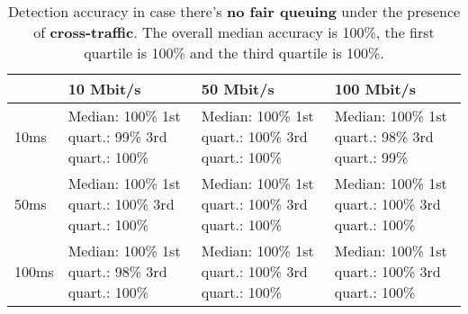 \documentclass[conference]{IEEEtran}
\begin{document}
\begin{table}
\begin{tabularx}{\columnwidth}{| l | X | X | X |}
\hline
& 10 Mbit/s & 50 Mbit/s & 100 Mbit/s \\ \hline
10ms & Median: 100\% \newline 1st quart.: 99\% \newline 3rd quart.: 100\% & Median: 100\% \newline 1st quart.: 100\% \newline 3rd quart.: 100\% & Median: 100\% \newline 1st quart.: 98\% \newline 3rd quart.: 99\%\\ \hline
50ms & Median: 100\% \newline 1st quart.: 100\% \newline 3rd quart.: 100\% & Median: 100\% \newline 1st quart.: 100\% \newline 3rd quart.: 100\% & Median: 100\% \newline 1st quart.: 100\% \newline 3rd quart.: 100\% \\ \hline
100ms & Median: 100\% \newline 1st quart.: 98\% \newline 3rd quart.: 100\% & Median: 100\% \newline 1st quart.: 100\% \newline 3rd quart.: 100\% & Median: 100\% \newline 1st quart.: 100\% \newline 3rd quart.: 100\% \\ \hline
\end{tabularx}
\caption{Detection accuracy in case there's \textbf{no fair queuing} under the presence of \textbf{cross-traffic}. The overall median accuracy is 100\%, the first quartile is 100\% and the third quartile is 100\%.}
\label{table:no_fq_crosstraffic}
\end{table}
\end{document}
